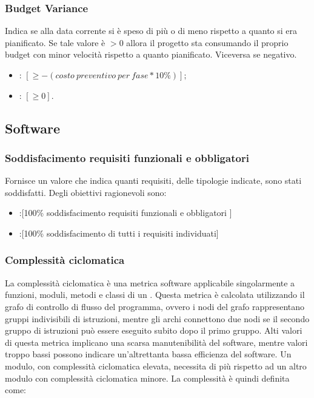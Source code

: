\subsubsection{Budget Variance}
Indica se alla data corrente si è speso di più o di meno rispetto a quanto si era pianificato. Se tale valore è $>0$ allora il progetto sta consumando il proprio budget con minor velocità rispetto a quanto pianificato. Viceversa se negativo.
\begin{itemize}
\item {}: $[\geq -(costo\:preventivo\:per\:fase * 10\%)];$
\item {}: $[\geq 0].$
\end{itemize}

\subsection{Software}
\subsubsection{Soddisfacimento requisiti funzionali e obbligatori}
Fornisce un valore che indica quanti requisiti, delle tipologie indicate, sono stati soddisfatti.
Degli obiettivi ragionevoli sono:
\begin{itemize}
\item {}:[100\% soddisfacimento requisiti funzionali e obbligatori ]
\item {}:[100\% soddisfacimento di tutti i requisiti individuati]
\end{itemize}

\subsubsection{Complessità ciclomatica}
\label{4.2.1}
La complessità ciclomatica è una metrica software applicabile singolarmente a funzioni, moduli, metodi e classi di un .
Questa metrica è calcolata utilizzando il grafo di controllo di flusso del programma, ovvero i nodi del grafo rappresentano gruppi indivisibili di istruzioni, mentre gli archi connettono due nodi se il secondo gruppo di istruzioni può essere eseguito subito dopo il primo gruppo.
Alti valori di questa metrica implicano una scarsa manutenibilità del software, mentre valori troppo bassi possono indicare un'altrettanta bassa efficienza del software.
Un modulo, con complessità ciclomatica elevata, necessita di più  rispetto ad un altro modulo con complessità ciclomatica minore.
La complessità è quindi definita come:

